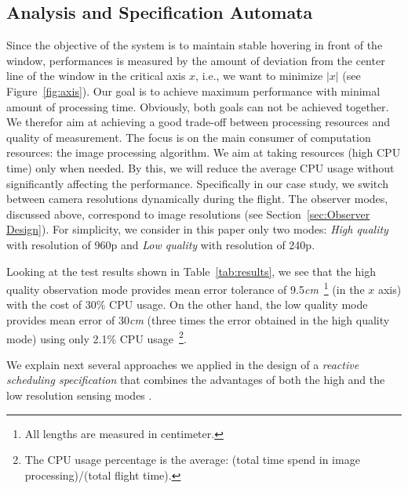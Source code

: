 \documentclass{sig-alternate-ipsn13}
\begin{document}
\subsection{Analysis and Specification Automata}
\label{sec:Analysis}

Since the objective of the system is to maintain stable hovering in front of the window, performances is measured by the amount of deviation from the center line of the window in the critical axis $x$, i.e., we want to minimize $\left| x \right|$ (see Figure~\ref{fig:axis}). Our goal is to achieve maximum performance with minimal amount of processing time. Obviously, both goals can not be achieved together. We therefor aim at achieving a good trade-off between processing resources and quality of measurement. The focus is on the main consumer of computation resources: the image processing algorithm.
We aim at taking resources (high CPU time) only when needed. By this, we will reduce the average CPU usage without significantly affecting the performance.
Specifically in our case study, we switch between camera resolutions dynamically during the flight. The observer modes, discussed above, correspond to image resolutions (see Section~\ref{sec:Observer Design}).
For simplicity, we consider in this paper only two modes: \textit{High quality} with resolution of 960p and \textit{Low quality} with resolution of 240p.

Looking at the test results shown in Table~\ref{tab:results}, we see that the high quality observation mode provides mean error tolerance of 9.5\textit{cm}~\footnote{All lengths are measured in centimeter.}  (in the $x$ axis) with the cost of 30\% CPU usage.
On the other hand, the low quality mode provides mean error of 30\textit{cm} (three times the error obtained in the high quality mode) using only 2.1\% CPU usage~\footnote{The CPU usage percentage is the average: (total time spend in image processing)/(total flight time). }.

We explain next several approaches we applied in the design of a \textit{reactive scheduling specification} that combines the advantages of both the high and the low resolution sensing modes .
\end{document}
